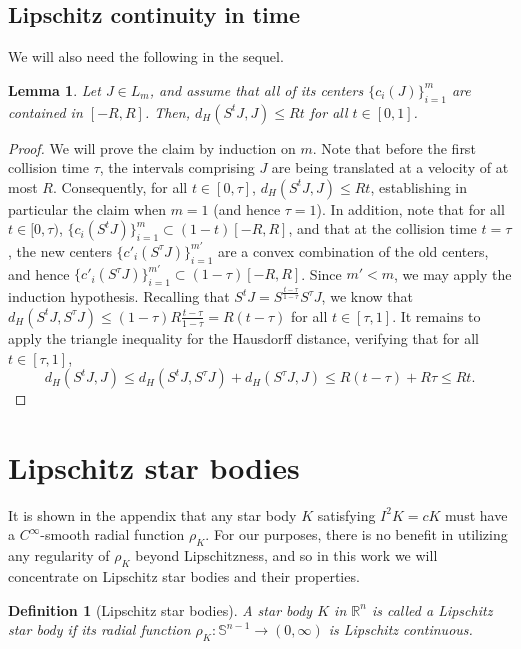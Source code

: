 \documentclass[11pt]{article}
\newtheorem{lem}[thm]{Lemma}
\newtheorem{defn}[thm]{Definition}
\theoremstyle{definition}
\theoremstyle{proof}
\DeclareMathOperator{\+}{\mathop{\tilde{+}}}
\newcommand{\R}{\mathbb{R}}
\renewcommand{\S}{\mathbb{S}}
\newcommand{\J}{L}
\numberwithin{equation}{section}
\numberwithin{equation}{section}
\begin{document}
\subsection{Lipschitz continuity in time}

We will also need the following in the sequel.

\begin{lem} \label{lem:StLip}
Let $J \in \J_m$, and assume that all of its centers $\{c_i(J)\}_{i=1}^m$ are contained in $[-R,R]$. Then, $d_H(S^t J , J) \leq R t$ for all $t \in [0,1]$.
\end{lem}
\begin{proof}
We will prove the claim by induction on $m$. Note that before the first collision time $\tau$, the intervals comprising $J$ are being translated at a velocity of at most $R$. Consequently, for all $t \in [0,\tau]$, $d_H(S^t J,J) \leq R t$, establishing in particular the claim when  $m=1$ (and hence $\tau=1$). In addition, note that for all $t \in [0,\tau)$, $\{c_i(S^t J)\}_{i=1}^m \subset (1-t) [-R,R]$, and that at the collision time $t=\tau$, the new centers $\{c'_i(S^\tau J) \}_{i=1}^{m'}$ are a convex combination of the old centers, and hence $\{c'_i(S^\tau J)\}_{i=1}^{m'} \subset (1-\tau) [-R,R]$. Since $m' < m$, we may apply the induction hypothesis. Recalling that $S^t J = S^{\frac{t-\tau}{1-\tau}} S^\tau J$, we know that $d_H(S^t J , S^\tau J) \leq (1-\tau) R \frac{t-\tau}{1-\tau} = R (t-\tau)$ for all $t \in [\tau ,1]$. It remains to apply the triangle inequality for the Hausdorff distance, verifying that for all $t \in [\tau,1]$,
\[
d_H(S^t J , J) \leq  d_H(S^t J, S^\tau J) + d_H(S^\tau J , J) \leq  R (t-\tau) + R \tau \leq R t . 
\]
\end{proof}




\section{Lipschitz star bodies} \label{sec:Lip}


It is shown in the appendix that any star body $K$ satisfying $I^2 K = c K$ must have a $C^\infty$-smooth radial function $\rho_K$. For our purposes, there is  no benefit in utilizing any regularity of $\rho_K$ beyond Lipschitzness, 
 and so in this work we will concentrate on Lipschitz star bodies and their properties. 


\begin{defn}[Lipschitz star bodies]
A star body $K$ in $\R^n$ is called a Lipschitz star body if its radial function $\rho_K : \S^{n-1} \rightarrow (0,\infty)$ is Lipschitz continuous. 
\end{defn}
\end{document}
